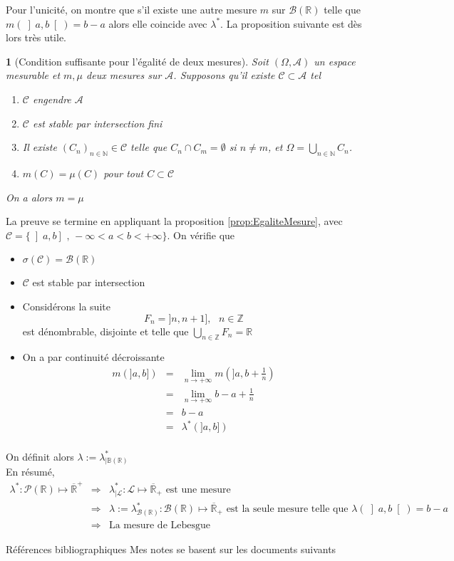 \documentclass[8pt,notheorems]{beamer}
\def \R{\mathbb R}
\def \Om{\Omega}
\def \N{\mathbb N}
\newtheorem{prop}{\translate{Proposition}}
\theoremstyle{definition}
\theoremstyle{example}
\theoremstyle{mystyle}
\theoremstyle{plain}
\begin{document}
\begin{frame}[allowframebreaks]
Pour l'unicité, on montre que s'il existe une autre mesure $m$ sur $\mathcal{B}(\R)$
telle que $m(\left]a,b\right[)=b-a$ alors elle coincide avec $\lambda^{\ast}$. La proposition suivante est dès lors très utile.
\begin{prop}[Condition suffisante pour l'égalité de deux mesures]\label{prop:EgaliteMesure}
  Soit $(\Om,\mathcal{A})$ un espace mesurable et $m,\mu$ deux mesures sur $\mathcal{A}$. Supposons qu'il existe $\mathcal{C}\subset\mathcal{A}$ tel
  \begin{enumerate}
    \item $\mathcal{C}$ engendre $\mathcal{A}$
    \item $\mathcal{C}$ est stable par intersection fini
    \item Il existe $(C_n)_{n\in\N}\in\mathcal{C}$ telle que $C_n\cap C_m=\emptyset$ si $n\neq m$, et $\Om=\bigcup_{n\in\N}C_n$.
    \item $m(C)=\mu(C)$ pour tout $C\subset\mathcal{C}$
  \end{enumerate}
  On a alors $m=\mu$
\end{prop}
La preuve se termine en appliquant la proposition \eqref{prop:EgaliteMesure},
avec $\mathcal{C}=\{\left]a,b\right]\text{ , }-\infty< a<b<+\infty\}$. On vérifie que
\begin{itemize}
\item $\sigma(\mathcal{C})=\mathcal{B}(\R)$
\item $\mathcal{C}$ est stable par intersection
\item Considérons la suite
$$
F_n=]n,n+1],\text{ }n\in\mathbb{Z}
$$
est dénombrable, disjointe et telle que $\bigcup_{n\in\mathbb{Z}}F_n=\R$
\item On a par continuité décroissante
\begin{eqnarray*}
m(]a,b])&=&\underset{n\rightarrow+\infty}{\lim}m(]a,b+\frac{1}{n})\\
&=&\underset{n\rightarrow+\infty}{\lim}b-a+\frac{1}{n}\\
&=&b-a\\
&=&\lambda^{\ast}(]a,b])\\
\end{eqnarray*}
\end{itemize}

 On définit alors $\lambda:=\lambda^{\ast}_{|\mathbb{B}(\mathbb{R})}$\\
En résumé,
\begin{eqnarray*}
\lambda^{\ast}:\mathcal{P}(\R)\mapsto\overline{\mathbb{R}}^{+}&\Rightarrow&\lambda^{\ast}_{|\mathcal{L}}:\mathcal{L}\mapsto\overline{\mathbb{R}}_{+}\text{ est une mesure}\\
&\Rightarrow&\lambda:=\lambda^{\ast}_{\mathcal{B}(\R)}:\mathcal{B}(\R)\mapsto\overline{\mathbb{R}}_{+}\text{ est la seule mesure telle que  }\lambda(\left]a,b\right[)=b-a\\
&\Rightarrow& \text{La mesure de Lebesgue}
\end{eqnarray*}

\end{frame}
\begin{frame}[allowframebreaks]{Références bibliographiques}
Mes notes se basent sur les documents suivants \cite{Ca09,le2006integration,GaKu11}


\end{frame}
\end{document}

